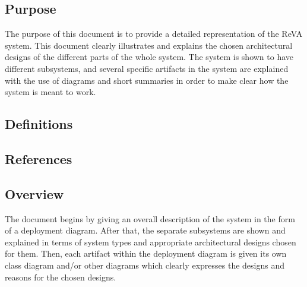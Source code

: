 \subsection{Purpose}
The purpose of this document is to provide a detailed representation of the ReVA system. This document clearly illustrates and explains the chosen architectural designs of the different parts of the whole system. The system is shown to have different subsystems, and several specific artifacts in the system are explained with the use of diagrams and short summaries in order to make clear how the system is meant to work.
\subsection{Definitions}
\subsection{References}
\subsection{Overview}
The document begins by giving an overall description of the system in the form of a deployment diagram. After that, the separate subsystems are shown and explained in terms of system types and appropriate architectural designs chosen for them. Then, each artifact within the deployment diagram is given its own class diagram and/or other diagrams which clearly expresses the designs and reasons for the chosen designs.